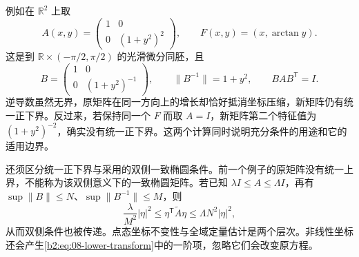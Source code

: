\ProseParagraphBreak

例如在 \(\mathbb R^2\) 上取
\[
 A(x,y)=\begin{pmatrix}1&0\\0&(1+y^2)^2\end{pmatrix},
 \qquad F(x,y)=(x,\arctan y).
\]
这是到 \(\mathbb R\times(-\pi/2,\pi/2)\) 的光滑微分同胚，且
\[
 B=\begin{pmatrix}1&0\\0&(1+y^2)^{-1}\end{pmatrix},
 \qquad \|B^{-1}\|=1+y^2,
 \qquad BAB^{\mathsf T}=I.
\]
逆导数虽然无界，原矩阵在同一方向上的增长却恰好抵消坐标压缩，新矩阵仍有统一正下界。反过来，若保持同一个 \(F\) 而取 \(A=I\)，新矩阵第二个特征值为 \((1+y^2)^{-2}\)，确实没有统一正下界。这两个计算同时说明充分条件的用途和它的适用边界。

\ProseParagraphBreak

还须区分统一正下界与采用的双侧一致椭圆条件。前一个例子的原矩阵没有统一上界，不能称为该双侧意义下的一致椭圆矩阵。若已知 \(\lambda I\leq A\leq\Lambda I\)，再有 \(\sup\|B\|\leq N\)、\(\sup\|B^{-1}\|\leq M\)，则
\[
 \frac{\lambda}{M^2}|\eta|^2
 \leq\eta^{\mathsf T}\widetilde A\eta
 \leq\Lambda N^2|\eta|^2,
\]
从而双侧条件也被传递。点态坐标不变性与全域定量估计是两个层次。非线性坐标还会产生\eqref{b2:eq:08-lower-transform}中的一阶项，忽略它们会改变原方程。
